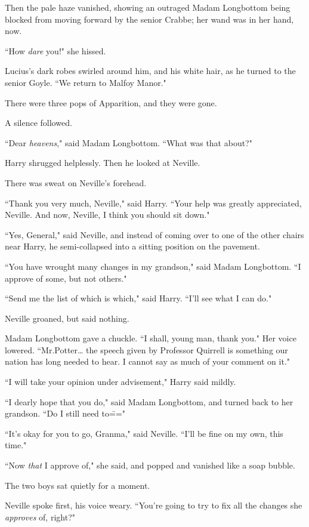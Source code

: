 Then the pale haze vanished, showing an outraged Madam Longbottom being blocked from moving forward by the senior Crabbe; her wand was in her hand, now.

``How \emph{dare} you!" she hissed.

Lucius's dark robes swirled around him, and his white hair, as he turned to the senior Goyle. ``We return to Malfoy Manor."

There were three pops of Apparition, and they were gone.

A silence followed.

``Dear \emph{heavens}," said Madam Longbottom. ``What was that about?"

Harry shrugged helplessly. Then he looked at Neville.

There was sweat on Neville's forehead.

``Thank you very much, Neville," said Harry. ``Your help was greatly appreciated, Neville. And now, Neville, I think you should sit down."

``Yes, General," said Neville, and instead of coming over to one of the other chairs near Harry, he semi-collapsed into a sitting position on the pavement.

``You have wrought many changes in my grandson," said Madam Longbottom. ``I approve of some, but not others."

``Send me the list of which is which," said Harry. ``I'll see what I can do."

Neville groaned, but said nothing.

Madam Longbottom gave a chuckle. ``I shall, young man, thank you." Her voice lowered. ``Mr.\?Potter{\ldots} the speech given by Professor Quirrell is something our nation has long needed to hear. I cannot say as much of your comment on it."

``I will take your opinion under advisement," Harry said mildly.

``I dearly hope that you do," said Madam Longbottom, and turned back to her grandson. ``Do I still need to\==="

``It's okay for you to go, Granma," said Neville. ``I'll be fine on my own, this time."

``Now \emph{that} I approve of," she said, and popped and vanished like a soap bubble.

The two boys sat quietly for a moment.

Neville spoke first, his voice weary. ``You're going to try to fix all the changes she \emph{approves} of, right?"


